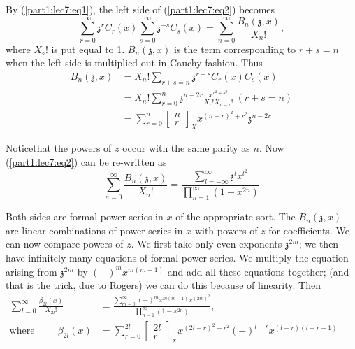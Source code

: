 By (\ref{part1:lec7:eq1}), the left side of (\ref{part1:lec7:eq2}) becomes
$$
\sum^\infty_{r=0} \mathfrak{z}^r C_r (x) \sum^\infty_{s=0}
\mathfrak{z}^{-s} C_s (x) = \sum^\infty_{n=0} \frac{B_n (\mathfrak{z},
  x)}{X_n!}, 
$$
where $X_\circ !$ is put equal to 1. $B_n (\mathfrak{z}, x)$ is the
term corresponding to $r+s=n$ when the left side is multiplied out in
Cauchy fashion. Thus
\begin{align*}
  B_n (\mathfrak{z}, x) & = X_n ! \sum_{r+s=n} \mathfrak{z}^{r-s} C_r
  (x) C_s (x)\\
  & = X_n ! \sum^n_{r=0} \mathfrak{z}^{n-2r} \frac{x^{r^2+s^2}}{X_r!
    X_{n-r}!}~(r+s=n)\\
  & = \sum^n_{r=0} \begin{bmatrix} n\\r \end{bmatrix}_X x^{(n-r)^2+
    r^2} \mathfrak{z}^{n-2r}
\end{align*}

Notice\pageoriginale that the powers of $z$ occur with the same
parity as $n$. Now (\ref{part1:lec7:eq2}) can be re-written as 
$$
\sum^\infty_{n=0} \frac{B_n(\mathfrak{z}, x)}{X_n!} =
\frac{\sum\limits^\infty_{l=-\infty} \mathfrak{z}^l
  x^{l^2}}{\prod\limits^\infty_{n=1} (1- x^{2n})}
$$ 

Both sides are formal power series in $x$ of the appropriate sort. The
$B_n(\mathfrak{z}, x)$ are linear combinations of power series in $x$
with powers of $z$ for coefficients. We can now compare powers of
$z$. We first take only even exponents $\mathfrak{z}^{2m}$; we then
have infinitely many equations of formal power series. We multiply the
equation arising from $\mathfrak{z}^{2m}$ by $(-)^m x^{m(m-1)}$ and
add all these equations together; (and that is the trick, due to
Rogers) we can do this because of linearity. Then
\begin{align*}
\sum^\infty_{l=0} \frac{\beta_{2l} (x)}{X_{2l}!} & =
  \frac{\sum\limits^\infty_{m=0} (-)^m
    x^{m(m-1)}x^{(2m)^2}}{\prod\limits^\infty_{n=1}
    (1-x^{2n})},\tag{3}\label{part1:lec7:eq3} \\
  \text{where} \hspace{1cm} \beta_{2l} (x) & =
  \sum^{2l}_{r=0} \begin{bmatrix}2l\\r\end{bmatrix}_X x^{(2l -r)^2 +
      r^2} (-)^{l-r}x^{(l-r)(l-r-1)}\hspace{1cm}
\end{align*}

